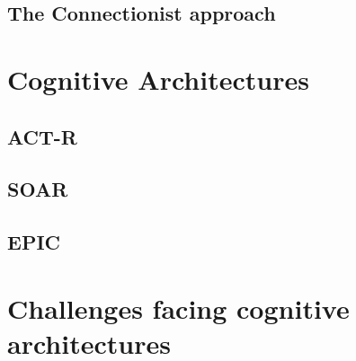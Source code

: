 \subsection{The Connectionist approach}
\section{Cognitive Architectures}
\subsection{ACT-R}
\subsection{SOAR}
\subsection{EPIC}
\section{Challenges facing cognitive architectures}
